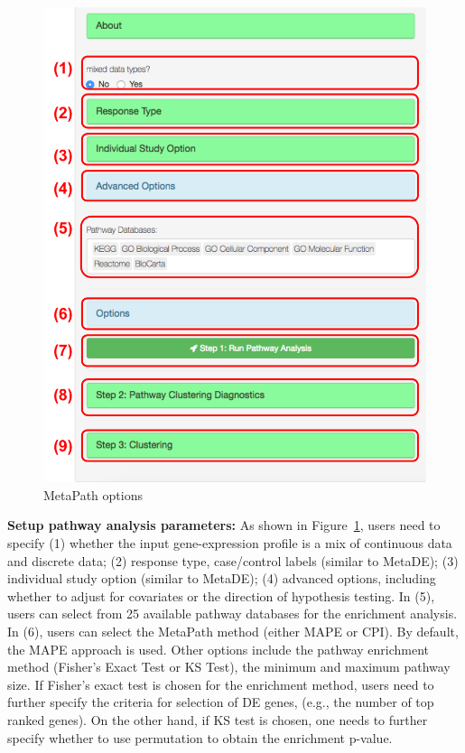 \begin{figure}[H]
\begin{center}
\includegraphics[scale=0.5]{./figure/metaPath/metaPathoption.pdf}
\caption{MetaPath options}
\label{fig:MetaPathoption}
\end{center}
\end{figure}

\textbf{Setup pathway analysis parameters:}
As shown in Figure~\ref{fig:MetaPathoption},
users need to specify {\color{red}(1)} whether the input gene-expression profile is a mix of continuous data and discrete data;
{\color{red}(2)} response type, case/control labels (similar to MetaDE);
{\color{red}(3)} individual study option (similar to MetaDE);
{\color{red}(4)} advanced options, including whether to adjust for covariates or the direction of hypothesis testing.
In {\color{red}(5)}, users can select from 25 available pathway databases for the enrichment analysis.
In {\color{red}(6)}, users can select the MetaPath method (either MAPE or CPI).
By default, the MAPE approach is used. 
Other options include the pathway enrichment method (Fisher's Exact Test or KS Test), 
the minimum and maximum pathway size. If Fisher's exact test is chosen for the enrichment method, users need to further specify the criteria for selection of DE genes, (e.g., the number of top ranked genes). 
On the other hand, if KS test is chosen, one needs to further specify whether to use permutation to obtain the enrichment p-value. 

